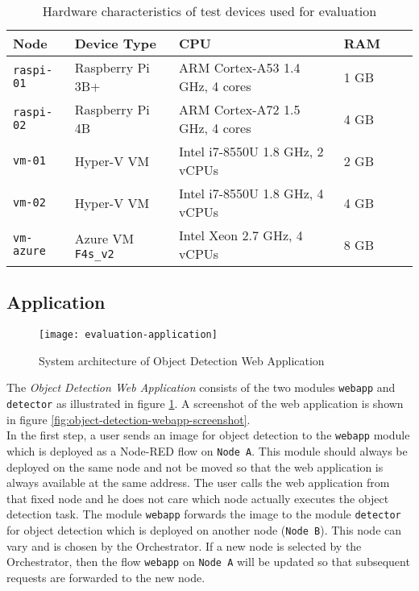 \begin{table}[htb]
    \centering
    \begin{tabular}{|l|l|l|l|l|l|}
    \hline
        \textbf{Node} & \textbf{Device Type} & \textbf{CPU} & \textbf{RAM} \\
         \hline
         \texttt{raspi-01} & Raspberry Pi 3B+ & ARM Cortex-A53 1.4 GHz, 4 cores & 1 GB\\
         \hline
         \texttt{raspi-02} & Raspberry Pi 4B & ARM Cortex-A72 1.5 GHz, 4 cores & 4 GB\\
         \hline
         \texttt{vm-01} & Hyper-V VM & Intel i7-8550U 1.8 GHz, 2 vCPUs & 2 GB\\
         \hline
         \texttt{vm-02} & Hyper-V VM & Intel i7-8550U 1.8 GHz, 4 vCPUs & 4 GB\\
         \hline
         \texttt{vm-azure} & Azure VM \texttt{F4s\_v2} & Intel Xeon 2.7 GHz, 4 vCPUs & 8 GB\\
         \hline
    \end{tabular}
    \caption{Hardware characteristics of test devices used for evaluation}
    \label{tab:evaluation-devices}
\end{table}

\subsection{Application\label{sec:eval-application}}

\begin{figure}[htb]
    \centering
    \texttt{[image: evaluation-application]}
    \caption{System architecture of Object Detection Web Application}
    \label{fig:evaluation-object-detection-application}
\end{figure}

The \textit{Object Detection Web Application} consists of the two modules \texttt{webapp} and \texttt{detector} as illustrated in figure \ref{fig:evaluation-object-detection-application}. A screenshot of the web application is shown in figure \ref{fig:object-detection-webapp-screenshot}.\\

In the first step, a user sends an image for object detection to the \texttt{webapp} module which is deployed as a Node-RED flow on \texttt{Node A}. This module should always be deployed on the same node and not be moved so that the web application is always available at the same address. The user calls the web application from that fixed node and he does not care which node actually executes the object detection task. The module \texttt{webapp} forwards the image to the module \texttt{detector} for object detection which is deployed on another node (\texttt{Node B}). This node can vary and is chosen by the Orchestrator. If a new node is selected by the Orchestrator, then the flow \texttt{webapp} on \texttt{Node A} will be updated so that subsequent requests are forwarded to the new node.\\

